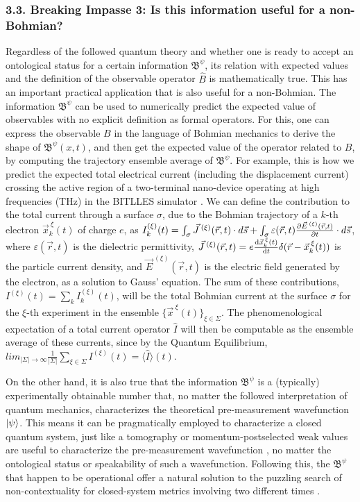 \documentclass[11pt, a4paper]{article} %
\newcommand{\B}{\mathfrak{B}}
\begin{document}
\subsubsection*{3.3. Breaking Impasse 3: Is this information useful for a non-Bohmian?}
\vspace{-0.15cm}
Regardless of the followed quantum theory and whether one is ready to accept an ontological status for a certain information $\B^\psi$, its relation with expected values and the definition of the observable operator $\hat{B}$ is mathematically true. This has an important practical application that is also useful for a non-Bohmian. The information $\B^\psi$ can be used to numerically predict the expected value of observables with no explicit definition as formal operators. For this, one can express the observable $B$ in the language of Bohmian mechanics to derive the shape of $\B^\psi(x,t)$, and then get the expected value of the operator related to $B$, by computing the trajectory ensemble average of $\B^\psi$. For example, this is how we predict the expected total electrical current (including the displacement current) crossing the active region of a two-terminal nano-device operating at high frequencies (THz) in the BITLLES simulator \cite{equiv, Pel}. We can define the contribution to the total current through a surface $\sigma$, due to the Bohmian trajectory of a $k$-th electron $\vec{x}_k^{\:\xi}(t)$ of charge $e$, as $I_k^{(\xi)}(t)=\int_\sigma \vec{J}^{\:(\xi)}(\vec{r},t)\cdot d\vec{s}+\int_\sigma \varepsilon(\vec{r},t)\pdv{\vec{E}^{\:(\xi)}(\vec{r},t)}{t}\cdot d\vec{s}$, where $\varepsilon(\vec{r},t)$ is the dielectric permittivity, $\vec{J}^{\:(\xi)}(\vec{r},t)=e\dv{\vec{x}_k^{\:\xi}(t)}{t}\delta(\vec{r}-\vec{x}_k^{\:\xi}(t))$ is the particle current density, and $\vec{E}^{\:(\xi)}(\vec{r},t)$ is the electric field generated by the electron, as a solution to Gauss' equation. The sum of these contributions, $I^{(\xi)}(t)=\sum_k I^{(\xi)}_k(t)$, will be the total Bohmian current at the surface $\sigma$ for the $\xi$-th experiment in the ensemble $\{\vec{x}^{\:\xi}(t)\}_{\xi\in \Sigma}$. The phenomenological expectation of a total current operator $\hat{I}$ will then be computable as the ensemble average of these currents, since by the Quantum Equilibrium, $lim_{|\Sigma|\rightarrow \infty}\frac{1}{|\Sigma|} \sum_{\xi\in\Sigma} I^{(\xi)}(t)=\langle \hat{I}\rangle(t)$.

On the other hand, it is also true that the information $\B^\psi$ is a (typically) experimentally obtainable number that, no matter the followed interpretation of quantum mechanics, characterizes the theoretical pre-measurement wavefunction $\ket{\psi}$. This means it can be pragmatically employed to characterize a closed quantum system, just like a tomography or momentum-postselected weak values are useful to characterize the pre-measurement wavefunction \cite{directWF}, no matter the ontological status or speakability of such a wavefunction. Following this, the $\B^\psi$ that happen to be operational offer a natural solution to the puzzling search of non-contextuality for closed-system metrics involving two different times \cite{DevInPosition1}.
\end{document}
